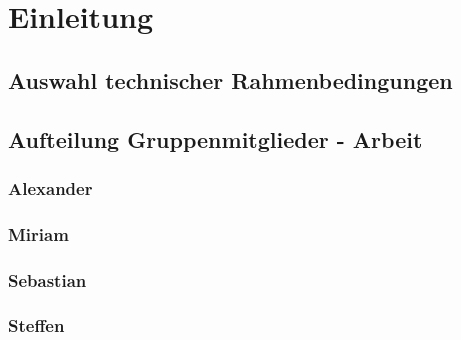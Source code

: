 \section{Einleitung}

\subsection{Auswahl technischer Rahmenbedingungen}

\subsection{Aufteilung Gruppenmitglieder - Arbeit}
\subsubsection{Alexander}
\subsubsection{Miriam}
\subsubsection{Sebastian}
\subsubsection{Steffen}